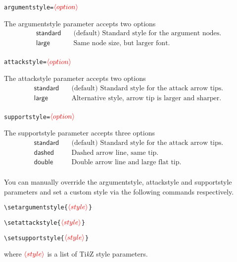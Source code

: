 \documentclass{article}
\newcommand{\tikzname}{Ti\emph{k}Z\xspace}
\newcommand{\opt}[2][red]{\ensuremath{\textcolor{#1}{\langle #2\rangle}}}
\begin{document}
\noindent\texttt{argumentstyle=}\opt{option}

    The \textsf{argumentstyle} parameter accepts two options
    \begin{align*}
        \mathsf{standard} &\quad \text{(default) Standard style for the argument nodes.}\\
        \mathsf{large} &\quad \text{Same node size, but larger font.}\\
    \end{align*}

\noindent\texttt{attackstyle=}\opt{option}
    
    The \textsf{attackstyle} parameter accepts two options
    \begin{align*}
        \mathsf{standard} &\quad \text{(default) Standard style for the attack arrow tips.}\\
        \mathsf{large} &\quad \text{Alternative style, arrow tip is larger and sharper.}\\
    \end{align*}

\noindent\texttt{supportstyle=}\opt{option}
    
    The \textsf{supportstyle} parameter accepts three options
    \begin{align*}
        \mathsf{standard} &\quad \text{(default) Standard style for the attack arrow tips.}\\
        \mathsf{dashed} &\quad \text{Dashed arrow line, same tip.}\\
        \mathsf{double} &\quad \text{Double arrow line and large flat tip.}\\
    \end{align*}

You can manually override the \textsf{argumentstyle}, \textsf{attackstyle} and \textsf{supportstyle} parameters and set a custom style via the following commands respectively.

\noindent
\verb|\setargumentstyle{|\opt{style}\verb|}|

\noindent
\verb|\setattackstyle{|\opt{style}\verb|}|

\noindent
\verb|\setsupportstyle{|\opt{style}\verb|}|

\begin{list}{}{\leftmargin=\parindent\rightmargin=0pt}
    \item
    where \opt{style} is a list of \tikzname style parameters.
\end{list}
\end{document}
